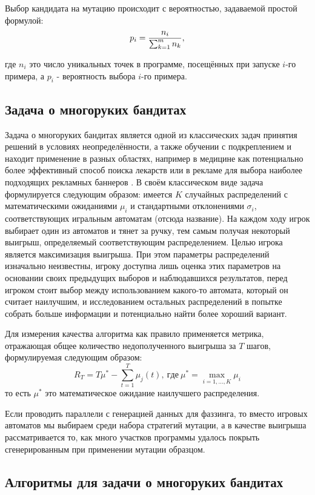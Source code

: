Выбор кандидата на мутацию происходит с вероятностью, задаваемой простой формулой:
\begin{equation*}
	p_i = \frac{n_i}{\sum_{k=1}^{m} n_k},
	\vspace{5pt}
\end{equation*}

\noindent где $n_i$ это число уникальных точек в программе, посещённых при запуске $i$-го примера, а $p_i$ - вероятность выбора $i$-го примера.

\subsection{Задача о многоруких бандитах}

Задача о многоруких бандитах является одной из классических задач принятия решений в условиях неопределённости, а также обучении с подкреплением и находит применение в разных областях, например в медицине как потенциально более эффективный способ поиска лекарств или в рекламе для выбора наиболее подходящих рекламных баннеров \cite{bandits}. В своём классическом виде задача формулируется следующим образом: имеется $K$ случайных распределений с математическими ожиданиями $\mu_i$ и стандартными отклонениями $\sigma_i$, соответствующих игральным автоматам (отсюда название). На каждом ходу игрок выбирает один из автоматов и тянет за ручку, тем самым получая некоторый выигрыш, определяемый соответствующим распределением. Целью игрока является максимизация выигрыша. При этом параметры распределений изначально неизвестны, игроку доступна лишь оценка этих параметров на основании своих предыдущих выборов и наблюдавшихся результатов, перед игроком стоит выбор между использованием какого-то автомата, который он считает наилучшим, и исследованием остальных распределений в попытке собрать больше информации и потенциально найти более хороший вариант.

Для измерения качества алгоритма как правило применяется метрика, отражающая общее количество недополученного выигрыша за $T$ шагов, формулируемая следующим образом:
\vspace{5pt}
\begin{equation*}
	R_T = T \mu^* - \sum_{t=1}^{T} \mu_j (t), \ \mathrm{где} \ \mu^* = \max_{i=1,...,K} \mu_i
\end{equation*} 
\vspace{7pt}
то есть $\mu^*$ это математическое ожидание наилучшего распределения.

\vspace{-10pt}
Если проводить параллели с генерацией данных для фаззинга, то вместо игровых автоматов мы выбираем среди набора стратегий мутации, а в качестве выигрыша рассматривается то, как много участков программы удалось покрыть сгенерированным при применении мутации образцом.

\subsection{Алгоритмы для задачи о многоруких бандитах}